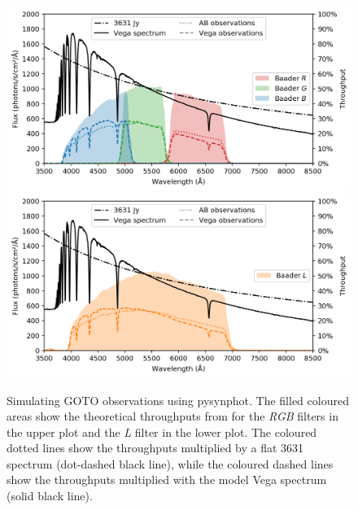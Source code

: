 \begin{colsection}
\begin{figure}[p]
    \begin{center}
        \includegraphics[width=\linewidth]{images/throughput/synphot_RGB.png}
        \includegraphics[width=\linewidth]{images/throughput/synphot_L.png}
    \end{center}
    \caption[Simulating photometric observations using pysynphot]{
        Simulating GOTO observations using pysynphot. The filled coloured areas show the theoretical throughputs from  for the \textit{RGB} filters in the upper plot and the \textit{L} filter in the lower plot. The coloured dotted lines show the throughputs multiplied by a flat \SI{3631}{\jansky} spectrum (dot-dashed black line), while the coloured dashed lines show the throughputs multiplied with the model Vega spectrum (solid black line).
    }\label{fig:pysynphot}
\end{figure}

\clearpage

\makeatletter
\setlength{\@fptop}{0\p@ \@plus 1fil} %
\makeatother

\newpage

\end{colsection}

